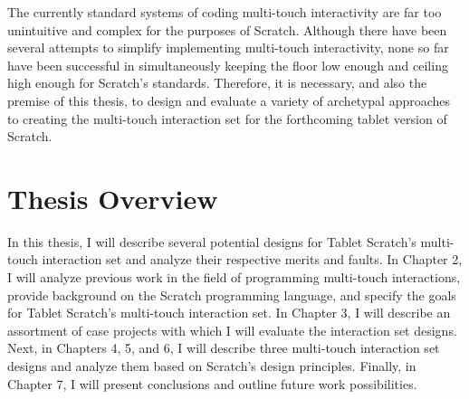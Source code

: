 The currently standard systems of coding multi-touch interactivity are far too unintuitive and complex for the purposes of Scratch. Although there have been several attempts to simplify implementing multi-touch interactivity, none so far have been successful in simultaneously keeping the floor low enough and ceiling high enough for Scratch's standards. Therefore, it is necessary, and also the premise of this thesis, to design and evaluate a variety of archetypal approaches to creating the multi-touch interaction set for the forthcoming tablet version of Scratch.

\section{Thesis Overview}
In this thesis, I will describe several potential designs for Tablet Scratch's multi-touch interaction set and analyze their respective merits and faults. In Chapter 2, I will analyze previous work in the field of programming multi-touch interactions, provide background on the Scratch programming language, and specify the goals for Tablet Scratch's multi-touch interaction set. In Chapter 3, I will describe an assortment of case projects with which I will evaluate the interaction set designs. Next, in Chapters 4, 5, and 6, I will describe three multi-touch interaction set designs and analyze them based on Scratch's design principles. Finally, in Chapter 7, I will present conclusions and outline future work possibilities.


